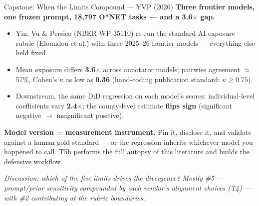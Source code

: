 \begin{frame}{Capstone: When the Limits Compound --- YVP (2026)}
\textbf{Three frontier models, one frozen prompt, 18{,}797 O*NET tasks --- and a 3.6$\times$ gap.}
\begin{itemize}
\item Yin, Vu \& Persico (NBER WP 35110) re-run the standard AI-exposure rubric (Eloundou et al.) with three 2025--26 frontier models --- everything else held fixed.
\item Mean exposure differs \textbf{3.6$\times$} across annotator models; pairwise agreement $\approx$57\%, Cohen's $\kappa$ as low as \textbf{0.36} (hand-coding publication standard: $\kappa \ge 0.75$).
\item Downstream, the same DiD regression on each model's scores: individual-level coefficients vary \textbf{2.4$\times$}; the county-level estimate \textbf{flips sign} (significant negative $\to$ insignificant positive).
\end{itemize}
\medskip
\begin{takeawaybox}
\textbf{Model version = measurement instrument.} Pin it, disclose it, and validate against a human gold standard --- or the regression inherits whichever model you happened to call. T5b performs the full autopsy of this literature and builds the defensive workflow.
\end{takeawaybox}
\smallskip
\textit{\footnotesize Discussion: which of the five limits drives the divergence? Mostly \#5 --- prompt/prior sensitivity compounded by each vendor's alignment choices (T4) --- with \#2 contributing at the rubric boundaries.}
\end{frame}

